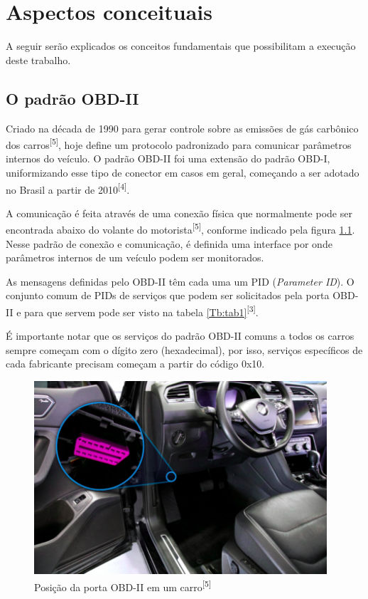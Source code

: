\chapter{Aspectos conceituais}
\label{CAP2}

A seguir serão explicados os conceitos fundamentais que possibilitam a execução deste trabalho. 


\section{O padrão OBD-II}

Criado na década de 1990 para gerar controle sobre as emissões de gás carbônico dos carros\textsuperscript{[5]}, hoje define um protocolo padronizado para comunicar parâmetros internos do veículo. O padrão OBD-II foi uma extensão do padrão OBD-I, uniformizando esse tipo de conector em casos em geral, começando a ser adotado no Brasil a partir de 2010\textsuperscript{[4]}.

A comunicação é feita através de uma conexão física que normalmente pode ser encontrada abaixo do volante do motorista\textsuperscript{[5]}, conforme indicado pela figura \ref{fig:obd2_conn}. Nesse padrão de conexão e comunicação, é definida uma interface por onde parâmetros internos de um veículo podem ser monitorados.

As mensagens definidas pelo OBD-II têm cada uma um PID (\textit{Parameter ID}). O conjunto comum de PIDs de serviços que podem ser solicitados pela porta OBD-II e para que servem pode ser visto na tabela \ref{Tb:tab1}\textsuperscript{[3]}.




É importante notar que os serviços do padrão OBD-II comuns a todos os carros sempre começam com o dígito zero (hexadecimal), por isso, serviços específicos de cada fabricante precisam começam a partir do código 0x10.

\begin{figure}[hp]
    \centering
    
    \includegraphics[]{figures/localizacao_obd2.png}
    
    \caption{Posição da porta OBD-II em um carro\textsuperscript{[5]}}
    
    \label{fig:obd2_conn}
\end{figure}

